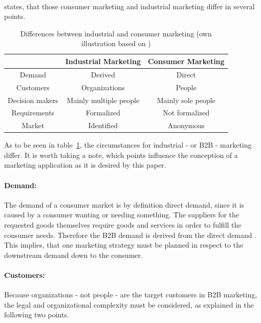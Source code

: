 \paragraph*{} \textcite[20-21]{Backhaus.2015} states, that those consumer marketing and industrial marketing differ in several points.
\begin{table}[H]
\begin{center}
\begin{tabular}{|c|c|c|}
\hline 
 & Industrial Marketing & Consumer Marketing \\ 
\hline 
Demand & Derived & Direct \\ 
\hline 
Customers & Organizations & People \\ 
\hline 
Decision makers & Mainly multiple people & Mainly sole people \\ 
\hline 
Requirements & Formalized & Not formalized \\ 
\hline 
Market & Identified & Anonymous \\ 
\hline 
\end{tabular} 
\end{center}
\caption[Differences between industrial and consumer marketing]{Differences between industrial and consumer marketing (own illustration based on \protect\cite[21]{Backhaus.2015})}
\label{tab:marketingdiff}
\end{table}
As to be seen in table~\ref{tab:marketingdiff}, the circumstances for industrial - or B2B - marketing differ. It is worth taking a note, which points influence the conception of a marketing application as it is desired by this paper. 
\paragraph*{Demand:} The demand of a consumer market is by definition direct demand, since it is caused by a consumer wanting or needing something. The suppliers for the requested goods themselves require goods and services in order to fulfill the consumer needs. Therefore the B2B demand is derived from the direct demand \parencite[see.][21]{Backhaus.2015b}. This implies, that one marketing strategy must be planned in respect to the downstream demand down to the consumer. 
\paragraph*{Customers:} Because organizations - not people - are the target customers in B2B marketing, the legal and organizational complexity must be considered, as explained in the following two points.
